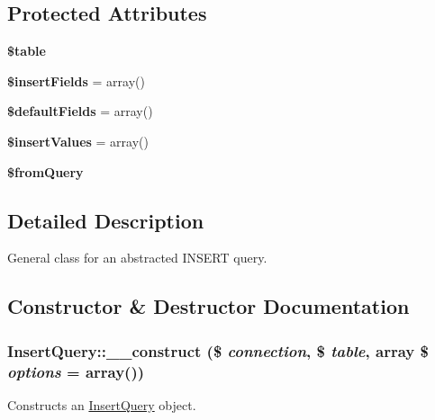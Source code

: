 \subsection*{Protected Attributes}
\begin{DoxyCompactItemize}
\item 
\hypertarget{classInsertQuery_a43d33012f33b9bc6067f5ccb247105ca}{
{\bfseries \$table}}
\label{classInsertQuery_a43d33012f33b9bc6067f5ccb247105ca}

\item 
\hypertarget{classInsertQuery_af3562bbf40254228eb6392e8df1309dd}{
{\bfseries \$insertFields} = array()}
\label{classInsertQuery_af3562bbf40254228eb6392e8df1309dd}

\item 
\hypertarget{classInsertQuery_a20210a70db8be3c64046a958c3b0436b}{
{\bfseries \$defaultFields} = array()}
\label{classInsertQuery_a20210a70db8be3c64046a958c3b0436b}

\item 
\hypertarget{classInsertQuery_acf0cf4f082daa5a451bdfbd27a471b2c}{
{\bfseries \$insertValues} = array()}
\label{classInsertQuery_acf0cf4f082daa5a451bdfbd27a471b2c}

\item 
\hypertarget{classInsertQuery_a82fee69eb0d2769190bf11edc8495e0e}{
{\bfseries \$fromQuery}}
\label{classInsertQuery_a82fee69eb0d2769190bf11edc8495e0e}

\end{DoxyCompactItemize}


\subsection{Detailed Description}
General class for an abstracted INSERT query. 

\subsection{Constructor \& Destructor Documentation}
\hypertarget{classInsertQuery_a2a5dd9afb005a1f14877a18dd3c3429d}{
\subsubsection[{\_\-\_\-construct}]{\setlength{\rightskip}{0pt plus 5cm}InsertQuery::\_\-\_\-construct (\$ {\em connection}, \/  \$ {\em table}, \/  array \$ {\em options} = {\ttfamily array()})}}
\label{classInsertQuery_a2a5dd9afb005a1f14877a18dd3c3429d}
Constructs an \hyperlink{classInsertQuery}{InsertQuery} object.


